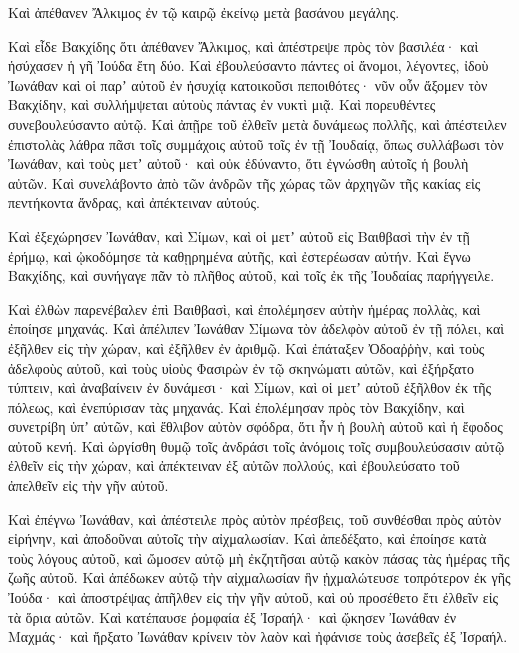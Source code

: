 {Καὶ ἀπέθανεν Ἄλκιμος ἐν τῷ καιρῷ ἐκείνῳ μετὰ βασάνου μεγάλης.
\par }{\PP {}Καὶ εἶδε Βακχίδης ὅτι ἀπέθανεν Ἄλκιμος, καὶ ἀπέστρεψε πρὸς τὸν βασιλέα· καὶ ἡσύχασεν ἡ γῆ Ἰούδα ἔτη δύο.
Καὶ ἐβουλεύσαντο πάντες οἱ ἄνομοι, λέγοντες, ἰδοὺ Ἰωνάθαν καὶ οἱ παρʼ αὐτοῦ ἐν ἡσυχίᾳ κατοικοῦσι πεποιθότες· νῦν οὖν ἄξομεν τὸν Βακχίδην, καὶ συλλήμψεται αὐτοὺς πάντας ἐν νυκτὶ μιᾷ.
Καὶ πορευθέντες συνεβουλεύσαντο αὐτῷ.
Καὶ ἀπῇρε τοῦ ἐλθεῖν μετὰ δυνάμεως πολλῆς, καὶ ἀπέστειλεν ἐπιστολὰς λάθρα πᾶσι τοῖς συμμάχοις αὐτοῦ τοῖς ἐν τῇ Ἰουδαίᾳ, ὅπως συλλάβωσι τὸν Ἰωνάθαν, καὶ τοὺς μετʼ αὐτοῦ· καὶ οὐκ ἐδύναντο, ὅτι ἐγνώσθη αὐτοῖς ἡ βουλὴ αὐτῶν.
Καὶ συνελάβοντο ἀπὸ τῶν ἀνδρῶν τῆς χώρας τῶν ἀρχηγῶν τῆς κακίας εἰς πεντήκοντα ἄνδρας, καὶ ἀπέκτειναν αὐτούς.
\par }{\PP {}Καὶ ἐξεχώρησεν Ἰωνάθαν, καὶ Σίμων, καὶ οἱ μετʼ αὐτοῦ εἰς Βαιθβασὶ τὴν ἐν τῇ ἐρήμῳ, καὶ ᾠκοδόμησε τὰ καθῃρημένα αὐτῆς, καὶ ἐστερέωσαν αὐτήν.
Καὶ ἔγνω Βακχίδης, καὶ συνήγαγε πᾶν τὸ πλῆθος αὐτοῦ, καὶ τοῖς ἐκ τῆς Ἰουδαίας παρήγγειλε.
\par }{\PP {}Καὶ ἐλθὼν παρενέβαλεν ἐπὶ Βαιθβασὶ, καὶ ἐπολέμησεν αὐτὴν ἡμέρας πολλὰς, καὶ ἐποίησε μηχανάς.
Καὶ ἀπέλιπεν Ἰωνάθαν Σίμωνα τὸν ἀδελφὸν αὐτοῦ ἐν τῇ πόλει, καὶ ἐξῆλθεν εἰς τὴν χώραν, καὶ ἐξῆλθεν ἐν ἀριθμῷ.
Καὶ ἐπάταξεν Ὀδοαῤῥὴν, καὶ τοὺς ἀδελφοὺς αὐτοῦ, καὶ τοὺς υἱοὺς Φασιρὼν ἐν τῷ σκηνώματι αὐτῶν, καὶ ἐξήρξατο τύπτειν, καὶ ἀναβαίνειν ἐν δυνάμεσι·
καὶ Σίμων, καὶ οἱ μετʼ αὐτοῦ ἐξῆλθον ἐκ τῆς πόλεως, καὶ ἐνεπύρισαν τὰς μηχανάς.
Καὶ ἐπολέμησαν πρὸς τὸν Βακχίδην, καὶ συνετρίβη ὑπʼ αὐτῶν, καὶ ἔθλιβον αὐτὸν σφόδρα, ὅτι ἦν ἡ βουλὴ αὐτοῦ καὶ ἡ ἔφοδος αὐτοῦ κενή.
Καὶ ὠργίσθη θυμῷ τοῖς ἀνδράσι τοῖς ἀνόμοις τοῖς συμβουλεύσασιν αὐτῷ ἐλθεῖν εἰς τὴν χώραν, καὶ ἀπέκτειναν ἐξ αὐτῶν πολλούς, καὶ ἐβουλεύσατο τοῦ ἀπελθεῖν εἰς τὴν γῆν αὐτοῦ.
\par }{\PP {}Καὶ ἐπέγνω Ἰωνάθαν, καὶ ἀπέστειλε πρὸς αὐτὸν πρέσβεις, τοῦ συνθέσθαι πρὸς αὐτὸν εἰρήνην, καὶ ἀποδοῦναι αὐτοῖς τὴν αἰχμαλωσίαν.
Καὶ ἀπεδέξατο, καὶ ἐποίησε κατὰ τοὺς λόγους αὐτοῦ, καὶ ὤμοσεν αὐτῷ μὴ ἐκζητῆσαι αὐτῷ κακὸν πάσας τὰς ἡμέρας τῆς ζωῆς αὐτοῦ.
Καὶ ἀπέδωκεν αὐτῷ τὴν αἰχμαλωσίαν ἣν ᾐχμαλώτευσε τοπρότερον ἐκ γῆς Ἰούδα· καὶ ἀποστρέψας ἀπῆλθεν εἰς τὴν γῆν αὐτοῦ, καὶ οὐ προσέθετο ἔτι ἐλθεῖν εἰς τὰ ὅρια αὐτῶν.
Καὶ κατέπαυσε ῥομφαία ἐξ Ἰσραήλ· καὶ ᾤκησεν Ἰωνάθαν ἐν Μαχμάς· καὶ ἤρξατο Ἰωνάθαν κρίνειν τὸν λαὸν καὶ ἠφάνισε τοὺς ἀσεβεῖς ἐξ Ἰσραήλ.

}
